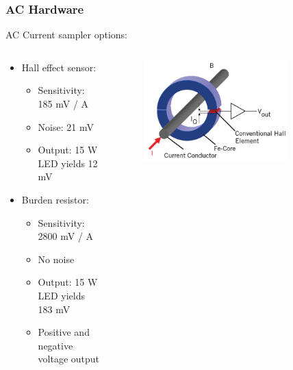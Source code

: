 \documentclass{beamer}
\begin{document}
	\begin{frame}\frametitle{AC Hardware}

		AC Current sampler options:

		\begin{columns}
			\begin{column}{0.48\textwidth}

				\begin{itemize}
					\item Hall effect sensor:

					\begin{itemize}
						\item Sensitivity: 185 mV / A
						\item Noise: 21 mV
						\item Output: 15 W LED yields 12 mV 
					\end{itemize}

					\item Burden resistor:

					\begin{itemize}
						\item Sensitivity: 2800 mV / A
						\item No noise 
						\item Output: 15 W LED yields 183 mV 
						\item Positive and negative voltage output %
					\end{itemize}


				\end{itemize}
			\end{column}
			\begin{column}{0.48\textwidth}

				\begin{figure}
					\centering
					\includegraphics[width=0.8\textwidth]{hall-effect-sensing}
				\end{figure}

			\end{column}
		\end{columns}


		

		
		
	\end{frame}
\end{document}
